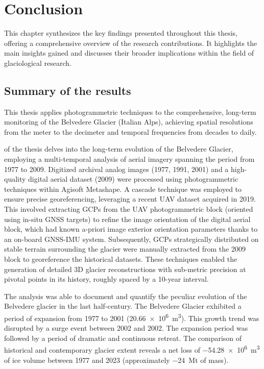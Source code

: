 \chapter{Conclusion}
\label{ch:conclusion}

This chapter synthesizes the key findings presented throughout this thesis, offering a comprehensive overview of the research contributions. 
It highlights the main insights gained and discusses their broader implications within the field of glaciological research.

\section{Summary of the results}

This thesis applies photogrammetric techniques to the comprehensive, long-term monitoring of the Belvedere Glacier (Italian Alps), achieving spatial resolutions from the meter to the decimeter and temporal frequencies from decades to daily.

 of the thesis delves into the long-term evolution of the Belvedere Glacier, employing a multi-temporal analysis of aerial imagery spanning the period from 1977 to 2009. 
Digitized archival analog images (1977, 1991, 2001) and a high-quality digital aerial dataset (2009) were processed using photogrammetric techniques within Agisoft Metashape.
A cascade technique was employed to ensure precise georeferencing, leveraging a recent UAV dataset acquired in 2019.
This involved extracting GCPs from the UAV photogrammetric block (oriented using in-situ GNSS targets) to refine the image orientation of the digital aerial block, which had known a-priori image exterior orientation parameters thanks to an on-board GNSS-IMU system. 
Subsequently, GCPs strategically distributed on stable terrain surrounding the glacier were manually extracted from the 2009 block to georeference the historical datasets.
These techniques enabled the generation of detailed 3D glacier reconstructions with sub-metric precision at pivotal points in its history, roughly spaced by a 10-year interval.

The analysis was able to document and quantify the peculiar evolution of the Belvedere glacier in the last half-century.
The Belvedere Glacier exhibited a period of expansion from 1977 to 2001 (\SI[retain-explicit-plus]{+20.66e6}{\cubic\meter}). 
This growth trend was disrupted by a surge event between 2002 and 2002.
The expansion period was followed by a period of dramatic and continuous retreat.  
The comparison of historical and contemporary glacier extent reveals a net loss of \SI{-54.28e6}{\cubic\meter} of ice volume between 1977 and 2023 (approximately \SI{-24}{\mega\tonne} of mass).

